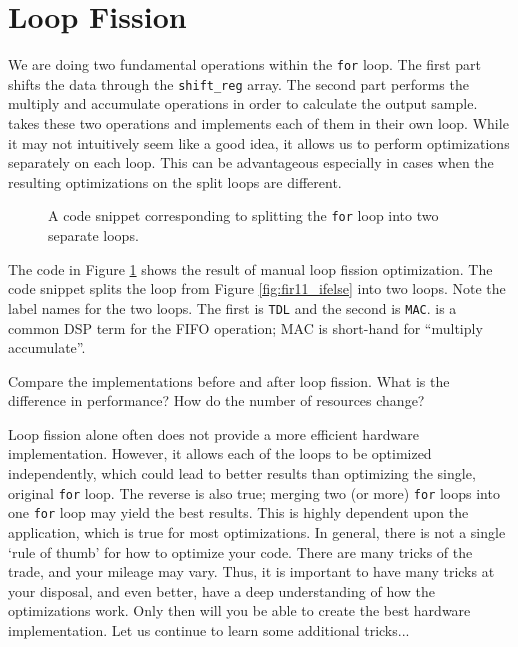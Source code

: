 
\section{Loop Fission}

We are doing two fundamental operations within the \lstinline{for} loop. The first part shifts the data through the \lstinline{shift_reg} array. The second part performs the multiply and accumulate operations in order to calculate the output sample.  takes these two operations and implements each of them in their own loop. While it may not intuitively seem like a good idea, it allows us to perform optimizations separately on each loop. This can be advantageous especially in cases when the resulting optimizations on the split loops are different. 

\begin{figure}

\caption{ A code snippet corresponding to splitting the \lstinline{for} loop into two separate loops. }
\label{fig:fir11_partition}
\end{figure}


The code in Figure \ref{fig:fir11_partition} shows the result of manual loop fission optimization.  The code snippet splits the loop from Figure \ref{fig:fir11_ifelse} into two loops. Note the label names for the two loops. The first is \lstinline{TDL} and the second is \lstinline{MAC}.  is a common DSP term for the FIFO operation; MAC is short-hand for ``multiply accumulate''.

\begin{exercise}
Compare the implementations before and after loop fission. What is the difference in performance? How do the number of resources change?
\end{exercise}

Loop fission alone often does not provide a more efficient hardware implementation. However, it allows each of the loops to be optimized independently, which could lead to better results than optimizing the single, original \lstinline{for} loop. The reverse is also true; merging two (or more) \lstinline{for} loops into one \lstinline{for} loop may yield the best results. This is highly dependent upon the application, which is true for most optimizations. In general, there is not a single `rule of thumb' for how to optimize your code. There are many tricks of the trade, and your mileage may vary. Thus, it is important to have many tricks at your disposal, and even better, have a deep understanding of how the optimizations work. Only then will you be able to create the best hardware implementation. Let us continue to learn some additional tricks...

